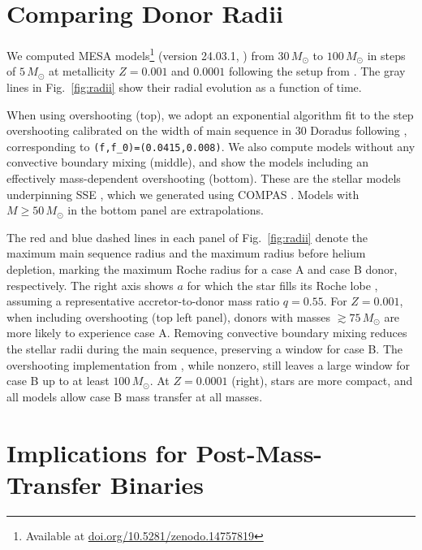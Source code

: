 \documentclass[twocolumn]{aastex631}
\DeclareRobustCommand{\Figref}[1]{Fig.~\ref{#1}}
\begin{document}
\section{Comparing Donor Radii}

We computed \textsc{MESA} models\footnote{Available at
  \href{https://doi.org/10.5281/zenodo.14757819}{doi.org/10.5281/zenodo.14757819}}
(version 24.03.1, \citealt{paxton:11, paxton:13, paxton:15, paxton:18,
  paxton:19, jermyn:23}) from $30 \, M_{\odot}$ to $100 \, M_{\odot}$
in steps of $5\,M_\odot$ at metallicity $Z=0.001$ and $0.0001$
following the setup from \cite{renzo:23}. The gray lines in
\Figref{fig:radii} show their radial evolution as a function of time.

When using overshooting (top), we adopt an exponential algorithm
\citep{herwig:00} fit to the step overshooting calibrated on the width
of main sequence in 30 Doradus \citep[$\sim{}0.335$ pressure scale
heights,][]{brott:11} following \cite{claret:18}, corresponding to
\texttt{(f,f\_0)=(0.0415,0.008)}. We also compute models without any
convective boundary mixing (middle), and show the \cite{pols:98}
models including an effectively mass-dependent overshooting (bottom).
These are the stellar models underpinning \textsc{SSE}
\citep{hurley:00}, which we generated using \textsc{COMPAS}
\citep{stevenson:17, vignagomez:18, riley:22}. Models with
$M\geq50\,M_\odot$ in the bottom panel are extrapolations.

The red and blue dashed lines in each panel of \Figref{fig:radii}
denote the maximum main sequence radius and the maximum radius before
helium depletion, marking the maximum Roche radius for a case A and
case B donor, respectively. The right axis shows $a$ for which the
star fills its Roche lobe \citet{eggleton:83}, assuming a
representative accretor-to-donor mass ratio $q=0.55$. For $Z=0.001$,
when including overshooting (top left panel), donors with masses
$ \gtrsim 75 \, M_{\odot}$ are more likely to experience case
A. Removing convective boundary mixing reduces the stellar radii
during the main sequence, preserving a window for case B. The
overshooting implementation from \cite{pols:98}, while nonzero, still
leaves a large window for case B up to at least $100 \, M_{\odot}$. At
$Z=0.0001$ (right), stars are more compact, and all models allow case
B mass transfer at all masses.

\section{Implications for Post-Mass-Transfer Binaries}
\end{document}
